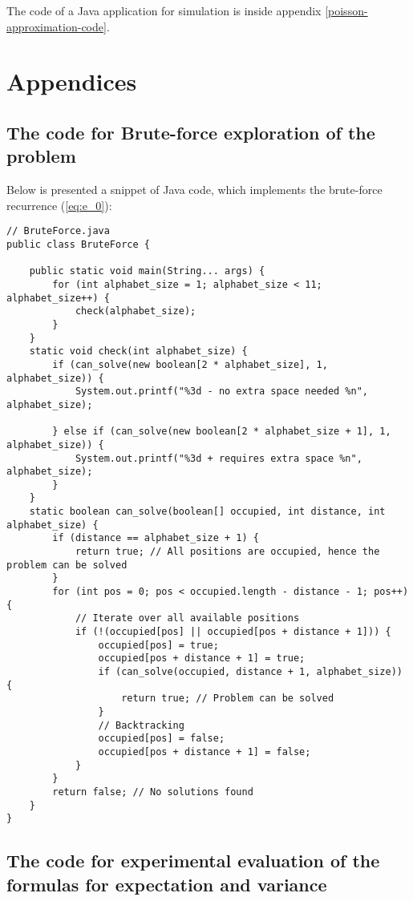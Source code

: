 \documentclass{article}
\begin{document}
The code of a Java application for simulation is inside appendix \ref{poisson-approximation-code}.

\clearpage

\appendix
\section{Appendices}

\subsection{The code for Brute-force exploration of the problem} \label{brute-force-code}
Below is presented a snippet of Java code, which implements the brute-force recurrence (\ref{eq:e_0}):

\begin{lstlisting}
// BruteForce.java
public class BruteForce {

	public static void main(String... args) {
		for (int alphabet_size = 1; alphabet_size < 11; alphabet_size++) {
			check(alphabet_size);
		}
	}
	static void check(int alphabet_size) {
		if (can_solve(new boolean[2 * alphabet_size], 1, alphabet_size)) {
			System.out.printf("%3d - no extra space needed %n", alphabet_size);

		} else if (can_solve(new boolean[2 * alphabet_size + 1], 1, alphabet_size)) {
			System.out.printf("%3d + requires extra space %n", alphabet_size);
		}
	}
	static boolean can_solve(boolean[] occupied, int distance, int alphabet_size) {
		if (distance == alphabet_size + 1) {
			return true; // All positions are occupied, hence the problem can be solved
		}
		for (int pos = 0; pos < occupied.length - distance - 1; pos++) {
			// Iterate over all available positions
			if (!(occupied[pos] || occupied[pos + distance + 1])) {
				occupied[pos] = true;
				occupied[pos + distance + 1] = true;
				if (can_solve(occupied, distance + 1, alphabet_size)) {
					return true; // Problem can be solved
				}
				// Backtracking
				occupied[pos] = false;
				occupied[pos + distance + 1] = false;
			}
		}
		return false; // No solutions found
	}
}
\end{lstlisting}

\clearpage

\subsection{The code for experimental evaluation of the formulas for expectation and variance} \label{expectation-variance-code}
\end{document}
